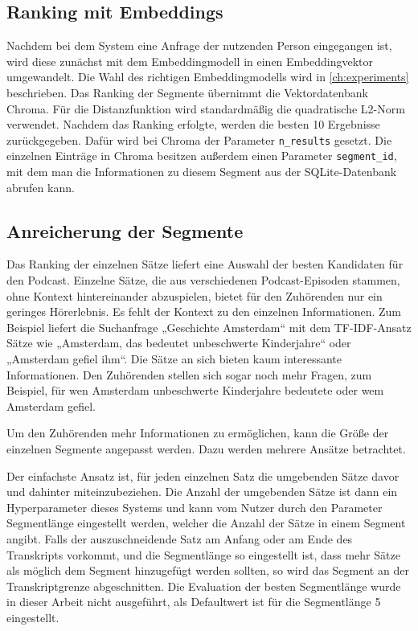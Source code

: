 \subsection{Ranking mit Embeddings}

Nachdem bei dem System eine Anfrage der nutzenden Person eingegangen ist, wird diese zunächst mit dem Embeddingmodell in einen Embeddingvektor umgewandelt.
Die Wahl des richtigen Embeddingmodells wird in \autoref{ch:experiments} beschrieben.
Das Ranking der Segmente übernimmt die Vektordatenbank Chroma.
Für die Distanzfunktion wird standardmäßig die quadratische L2-Norm verwendet.
Nachdem das Ranking erfolgte, werden die besten 10 Ergebnisse zurückgegeben.
Dafür wird bei Chroma der Parameter \verb|n_results| gesetzt.
Die einzelnen Einträge in Chroma besitzen außerdem einen Parameter \verb|segment_id|, mit dem man die Informationen zu diesem Segment aus der SQLite-Datenbank abrufen kann.


\subsection{Anreicherung der Segmente}

Das Ranking der einzelnen Sätze liefert eine Auswahl der besten Kandidaten für den Podcast.
Einzelne Sätze, die aus verschiedenen Podcast-Episoden stammen, ohne Kontext hintereinander abzuspielen, bietet für den Zuhörenden nur ein geringes Hörerlebnis.
Es fehlt der Kontext zu den einzelnen Informationen.
Zum Beispiel liefert die Suchanfrage „Geschichte Amsterdam“ mit dem TF-IDF-Ansatz Sätze wie „Amsterdam, das bedeutet unbeschwerte Kinderjahre“ oder „Amsterdam gefiel ihm“.
Die Sätze an sich bieten kaum interessante Informationen.
Den Zuhörenden stellen sich sogar noch mehr Fragen, zum Beispiel, für wen Amsterdam unbeschwerte Kinderjahre bedeutete oder wem Amsterdam gefiel.

Um den Zuhörenden mehr Informationen zu ermöglichen, kann die Größe der einzelnen Segmente angepasst werden.
Dazu werden mehrere Ansätze betrachtet.

Der einfachste Ansatz ist, für jeden einzelnen Satz die umgebenden Sätze davor und dahinter miteinzubeziehen.
Die Anzahl der umgebenden Sätze ist dann ein Hyperparameter dieses Systems und kann vom Nutzer durch den Parameter Segmentlänge eingestellt werden, welcher die Anzahl der Sätze in einem Segment angibt.
Falls der auszuschneidende Satz am Anfang oder am Ende des Transkripts vorkommt, und die Segmentlänge so eingestellt ist, dass mehr Sätze als möglich dem Segment hinzugefügt werden sollten, so wird das Segment an der Transkriptgrenze abgeschnitten.
Die Evaluation der besten Segmentlänge wurde in dieser Arbeit nicht ausgeführt, als Defaultwert ist für die Segmentlänge 5 eingestellt.

